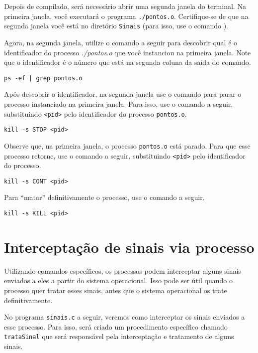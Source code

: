 Depois de compilado, será necessário abrir uma segunda janela do terminal. Na primeira janela, você executará o programa \texttt{./pontos.o}. Certifique-se de que na segunda janela você está no diretório \texttt{Sinais} (para isso, use o comando ).

Agora, na segunda janela, utilize o comando a seguir para descobrir qual é o identificador do processo \textit{./pontos.o} que você instanciou na primeira janela. Note que o identificador é o número que está na segunda coluna da saída do comando.

\begin{lstlisting}[style=MyBashStyle]
ps -ef | grep pontos.o
\end{lstlisting}

Após descobrir o identificador, na segunda janela use o comando  para parar o processo instanciado na primeira janela. Para isso, use o comando a seguir, substituindo \texttt{<pid>} pelo identificador do processo \texttt{pontos.o}.

\begin{lstlisting}[style=MyBashStyle]
kill -s STOP <pid>
\end{lstlisting}

Observe que, na primeira janela, o processo \texttt{pontos.o} está parado. Para que esse processo retorne, use o comando a seguir, substituindo \texttt{<pid>} pelo identificador do processo.

\begin{lstlisting}[style=MyBashStyle]
kill -s CONT <pid>
\end{lstlisting}

Para \enquote{matar} definitivamente o processo, use o comando a seguir.

\begin{lstlisting}[style=MyBashStyle]
kill -s KILL <pid>
\end{lstlisting}


\section{Interceptação de sinais via processo}
Utilizando comandos específicos, os processos podem interceptar alguns sinais enviados a eles a partir do sistema operacional. Isso pode ser útil quando o processo quer tratar esses sinais, antes que o sistema operacional os trate definitivamente.

No programa \texttt{sinais.c} a seguir, veremos como interceptar os sinais enviados a esse processo. Para isso, será criado um procedimento específico chamado \texttt{trataSinal} que será responsável pela interceptação e tratamento de alguns sinais.

